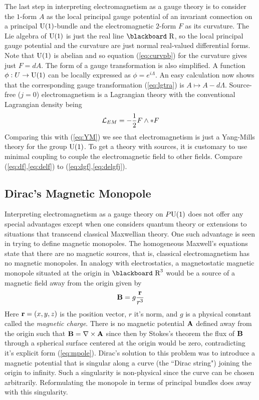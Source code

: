 \documentclass[12pt,titlepage]{article}
\def\bbf#1{\hbox{\blackboard #1}}
\def\lR{\bbf R}
\def\cL{{\cal L}}
\def\U{\hbox{U}}
\begin{document}
The last step in interpreting electromagnetism as a gauge theory is to
consider the \(1\)-form \(A\) as the local principal gauge potential of
an invariant connection on a principal \(\U(1)\)-bundle and the
electromagnetic \(2\)-form \(F\) as its curvature. 
The Lie algebra of \(\U(1)\) is just the real line \(\lR\), so the local
principal gauge potential and the curvature are just normal real-valued
differential forms.
Note that \(\U(1)\) is 
abelian and so equation (\ref{eq:curvpb}) for the curvature 
gives just \(F=dA\). The form of  a gauge transformation is also simplified.
 A function
\(\phi:U \to \U(1)\) can be locally expressed as \(\phi =
e^{i\Lambda}\). An easy calculation now shows that the corresponding
gauge transformation (\ref{eq:lgtra}) is \(A \mapsto A -d\Lambda\).
Source-free (\(j=0\)) electromagnetism is a Lagrangian theory
with the conventional Lagrangian density being
\[
\cL_{EM}= -\frac{1}{2}F\wedge *F
\]
Comparing this with (\ref{eq:YM}) we see that electromagnetism is just
a Yang-Mills theory for the group \(\U(1)\). To get a theory with
sources, it is customary to use minimal coupling to couple the
electromagnetic field to other fields. Compare
(\ref{eq:df},\ref{eq:delf}) to (\ref{eq:dgf},\ref{eq:delgfj}). 

\subsection{Dirac's Magnetic Monopole}%

Interpreting electromagnetism as a gauge theory on \(P\U(1)\) does not
offer any special advantages except when one considers quantum theory or
extensions to situations that transcend classical Maxwellian theory. One
such advantage is seen in trying to define magnetic monopoles. The
homogeneous Maxwell's equations state that there are no magnetic
sources, that is, classical electromagnetism has no magnetic monopoles.
%
 In analogy with electrostatics, a magnetostatic 
magnetic monopole situated at the origin in \(\lR^3\) would be a source of
a magnetic field away from the origin given by 
\begin{equation}\label{eq:mpole}%
{\bf B} = g\frac{{\bf r}}{r^3}
\end{equation}%
Here \({\bf r}=(x,y,z)\) is the position vector,  \(r\) it's norm, and
\(g\) is a physical constant called the  {\em magnetic charge\/}.
%
There is no magnetic potential \({\bf A}\) defined away from the origin
such that \({\bf B}={\bf \nabla}\times {\bf A}\) since then by Stokes's
theorem the flux of \({\bf B}\) through a spherical surface centered at
the origin would be zero, contradicting it's explicit form 
(\ref{eq:mpole}). Dirac's solution to this problem was to introduce a
magnetic potential that is singular along a curve (the ``Dirac string")
joining the origin to infinity. Such a singularity is non-physical
since the curve can be chosen arbitrarily. Reformulating the monopole in
terms of principal bundles does away with this singularity. 
\end{document}
